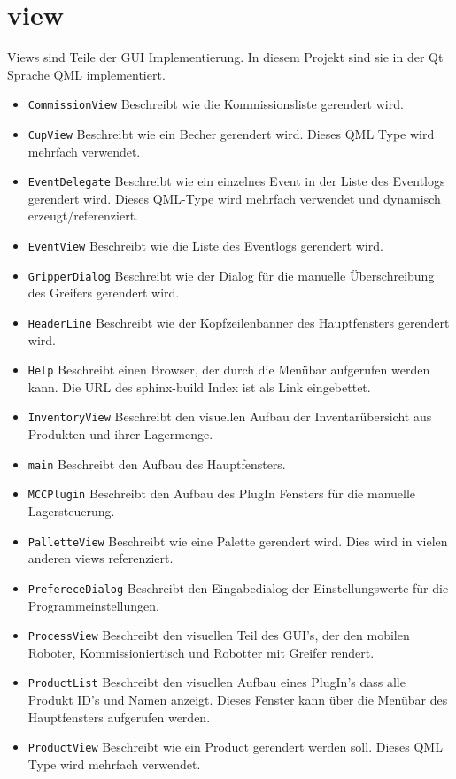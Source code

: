 \section*{view}
Views sind Teile der GUI Implementierung. In diesem Projekt sind sie in der Qt Sprache QML implementiert.
\begin{itemize}
    \item \verb|CommissionView| Beschreibt wie die Kommissionsliste gerendert wird.
    \item \verb|CupView| Beschreibt wie ein Becher gerendert wird. Dieses QML Type wird mehrfach verwendet.
    \item \verb|EventDelegate| Beschreibt wie ein einzelnes Event in der Liste des Eventlogs gerendert wird. Dieses QML-Type wird mehrfach verwendet und dynamisch erzeugt/referenziert.
    \item \verb|EventView| Beschreibt wie die Liste des Eventlogs gerendert wird.
    \item \verb|GripperDialog| Beschreibt wie der Dialog für die manuelle Überschreibung des Greifers gerendert wird.
    \item \verb|HeaderLine| Beschreibt wie der Kopfzeilenbanner des Hauptfensters gerendert wird.
    \item \verb|Help| Beschreibt einen Browser, der durch die Menübar aufgerufen werden kann. Die URL des sphinx-build Index ist als Link eingebettet. 
    \item \verb|InventoryView| Beschreibt den visuellen Aufbau der Inventarübersicht aus Produkten und ihrer Lagermenge.
    \item \verb|main| Beschreibt den Aufbau des Hauptfensters.
    \item \verb|MCCPlugin| Beschreibt den Aufbau des PlugIn Fensters für die manuelle Lagersteuerung.
    \item \verb|PalletteView| Beschreibt wie eine Palette gerendert wird. Dies wird in vielen anderen views referenziert. 
    \item \verb|PrefereceDialog| Beschreibt den Eingabedialog der Einstellungswerte für die Programmeinstellungen.
    \item \verb|ProcessView| Beschreibt den visuellen Teil des GUI's, der den mobilen Roboter, Kommissioniertisch und Robotter mit Greifer rendert. 
    \item \verb|ProductList| Beschreibt den visuellen Aufbau eines PlugIn's dass alle Produkt ID's und Namen anzeigt. Dieses Fenster kann über die Menübar des Hauptfensters aufgerufen werden.
    \item \verb|ProductView| Beschreibt wie ein Product gerendert werden soll. Dieses QML Type wird mehrfach verwendet.

\end{itemize}
